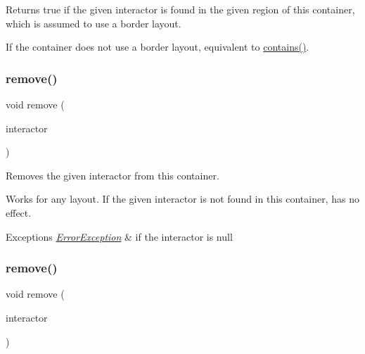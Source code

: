 Returns true if the given interactor is found in the given region of this container, which is assumed to use a border layout. 

If the container does not use a border layout, equivalent to \mbox{\hyperlink{classGContainer_a29e67f98cd36414c67475b8941d861a6}{contains()}}. \mbox{\label{classGContainer_a1c12b1fde5c2ef10d79d4ee51e670efa}} 
\subsubsection{\texorpdfstring{remove()}{remove()}\hspace{0.1cm}{\footnotesize\ttfamily [1/3]}}
{\footnotesize\ttfamily void remove (\begin{DoxyParamCaption}\item[{\mbox{\hyperlink{classGInteractor}{G\+Interactor}} $\ast$}]{interactor }\end{DoxyParamCaption})\hspace{0.3cm}{\ttfamily [virtual]}}



Removes the given interactor from this container. 

Works for any layout. If the given interactor is not found in this container, has no effect. 
\begin{DoxyExceptions}{Exceptions}
{\em \mbox{\hyperlink{classErrorException}{Error\+Exception}}} & if the interactor is null \\
\hline
\end{DoxyExceptions}
\mbox{\label{classGContainer_ade2376c458ac401a0bd2dbe44271509e}} 
\subsubsection{\texorpdfstring{remove()}{remove()}\hspace{0.1cm}{\footnotesize\ttfamily [2/3]}}
{\footnotesize\ttfamily void remove (\begin{DoxyParamCaption}\item[{\mbox{\hyperlink{classGInteractor}{G\+Interactor}} \&}]{interactor }\end{DoxyParamCaption})\hspace{0.3cm}{\ttfamily [virtual]}}



